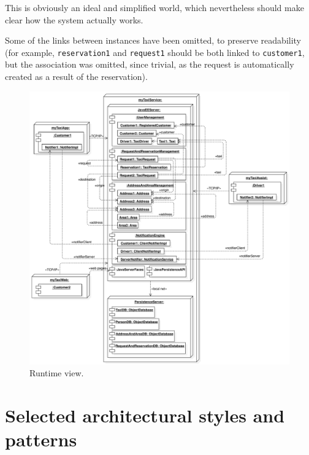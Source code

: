 This is obviously an ideal and simplified world, which nevertheless should make clear how the system actually works. 

Some of the links between instances have been omitted, to preserve readability (for example, \texttt{res\-er\-va\-tion1} and \texttt{re\-quest1} should be both linked to \texttt{cus\-tom\-er1}, but the association was omitted, since trivial, as the request is automatically created as a result of the reservation).

\begin{figure}%
	\centering%
	\includegraphics[width=\textwidth]{img/Runtime__RuntimeView_5}%
	\caption{Runtime view.}\label{fig:runtime}%
\end{figure}


\clearpage


\section{Selected architectural styles and patterns}\label{sec:styles}


